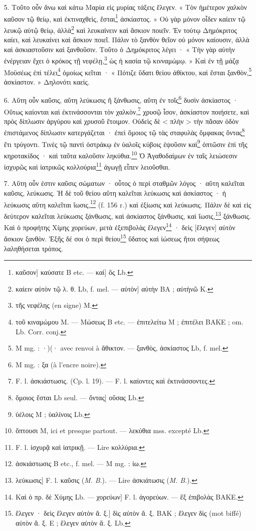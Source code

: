 \documentclass[a4paper, 11pt, oneside, polutonikogreek, french]{article}
\begin{document}
5. Τοῦτο οὖν ἄνω καὶ κάτω Μαρία εἰς μυρίας τάξεις ἔλεγεν. « Τὸν ἡμέτερον χαλκὸν καῦσον τῷ θείῳ, καὶ ἐκτιναχθεὶς, ἔσται\footnote{καῦσον] καύσατε B etc. --- καὶ] ὃς Lb.} ἀσκίαστος. » Οὐ γὰρ μόνον οἶδεν καίειν τῷ λευκῷ αὐτῷ θείῳ, ἀλλὰ\footnote{καίειν αὐτὸν τῷ λ. θ. Lb, f. mel. --- αὐτὸν] αὐτὴν BA ; αὐτὴνῶ K.} καὶ λευκαίνειν καὶ ἄσκιον ποιεῖν. Ἐν τούτῳ Δημόκριτος καίει, καὶ λευκαίνει καὶ ἄσκιον ποιεῖ. Πάλιν τὸ ξανθὸν θεῖον οὐ μόνον καίουσιν, ἀλλὰ καὶ ἀσκιαστοῦσιν καὶ ξανθοῦσιν. Τοῦτο ὁ Δημόκριτος λέγει · « Τὴν γὰρ αὐτὴν ἐνέργειαν ἔχει ὁ κρόκος τῇ νεφέλῃ,\footnote{τῆς νεφέλης (en signe) M.} ὡς ἡ κασία τῷ κινναμώμῳ. » Καὶ ἐν τῇ μάζᾳ Μοϋσέως ἐπὶ τέλει\footnote{τοῦ κιναμώμου M. --- Mώσεως B etc. --- ἐπιτελείτω M ; ἐπιτέλει BAKE ; om. Lb. Corr. conj.} ὁμοίως κεῖται · « Πότιζε ὕδατι θείου ἀθίκτου, καὶ ἔσται ξανθὸν,\footnote{M mg. : ·)(· avec renvoi à ἄθικτον. --- ξανθὸς, ἀσκίαστος Lb, f. mel.} ἀσκίαστον. » Δηλονότι καείς.

6. Αὕτη οὖν καῦσις, αὕτη λεύκωσις ἢ ξάνθωσις, αὕτη ἐν τοῖς\footnote{M mg. : ξα (à l'encre noire).} δυσὶν ἀσκίαστος · Οὕτως καίονται καὶ ἐκτινάσσονται τὸν χαλκὸν,\footnote{F. l. ἀσκιάστωσις. (Cp. l. 19). --- F. l. καίοντες καὶ ἐκτινάσσοντες.} χρυσῷ ἶσον, ἀσκίαστον ποιήσετε, καὶ πρὸς δίπλωσιν ἀργύρου καὶ χρυσοῦ ἔτοιμον. Οὐδεὶς δὲ < πλὴν > τὴν πᾶσαν ὁδὸν ἐπιστάμενος δίπλωσιν κατεργάζεται · ἐπεὶ ὅμοιος τῷ τὰς σταφυλὰς ὄμφακας ὄντας\footnote{ὅμοιος ἔσται Lb seul. --- ὄντας] οὔσας Lb.} ἔτι τρύγοντι. Τινὲς τῷ παντὶ ὀστράκῳ ἐν ὑαλοῖς κύβοις ἑψοῦσιν καὶ\footnote{ὑέλοις M ; ὑαλίνοις Lb.} ὀπτῶσιν ἐπὶ τῆς κηροτακίδος · καὶ ταῦτα καλοῦσιν ληκύθια.\footnote{ὄπτουσι M, ici et presque partout. --- λεκύθια mss. excepté Lb.} Ὁ Ἀγαθοδαίμων ἐν ταῖς λειώσεσιν ἰσχυρῶς καὶ ἰατρικῶς κολλούρια\footnote{F. l. ἰσχυρᾷ καὶ ἰατρικῇ. --- Lire κολλύρια.} ἀγωγῇ εἶπεν λειοῦσθαι.

7. Αὕτη οὖν ἐστιν καῦσις σώματων · οὗτος ὁ περὶ σταθμῶν λόγος · αὕτη καλεῖται καῦσις, λεύκωσις. Ἡ δὲ τοῦ θείου αὕτη καλεῖται λεύκωσις καὶ ἀσκίαστος · ἡ λεύκωσις αὕτη καλεῖται ἴωσις,\footnote{ἀσκιάστωσις B etc., f. mel. --- M mg. : ἰω.} (f. 156 r.) καὶ ἐξίωσις καὶ λεύκωσις. Πάλιν δὲ καὶ εἰς δεύτερον καλεῖται λεύκωσις ξάνθωσις, καὶ ἀσκίαστος ξάνθωσις, καὶ ἴωσις,\footnote{λεύκωσις] F. l. καῦσις (\emph{M. B.}). --- Lire ἀσκιάτωσις (\emph{M. B.}).} ξάνθωσις. Καὶ ὁ προφήτης Χίμης χορεύων, μετὰ ἐξεπιβολὰς ἔλεγεν\footnote{Καὶ ὁ πρ. δὲ Χύμης Lb. --- χορεύων] F. l. ἀγορεύων. --- ἓξ ἐπιβολὰς BAKE.} · δεὶς [ἔλεγεν] αὐτὸν ἄσκιον ξανθὸν. Ἐξῆς δέ σοι ὁ περὶ θείου\footnote{ἔλεγεν · δεὶς ἔλεγεν αὐτὸν ἄ. ξ.] δὶς αὐτὸν ἄ. ξ. BAK ; ἔλεγεν δὶς (mot biffé) αὐτὸν ἄ. ξ. E ; ἔλεγεν αὐτὸν ἄ. ξ. Lb.} ὕδατος καὶ ἰώσεως ἤτοι σήψεως λαληθήσεται τρόπος.
\end{document}
